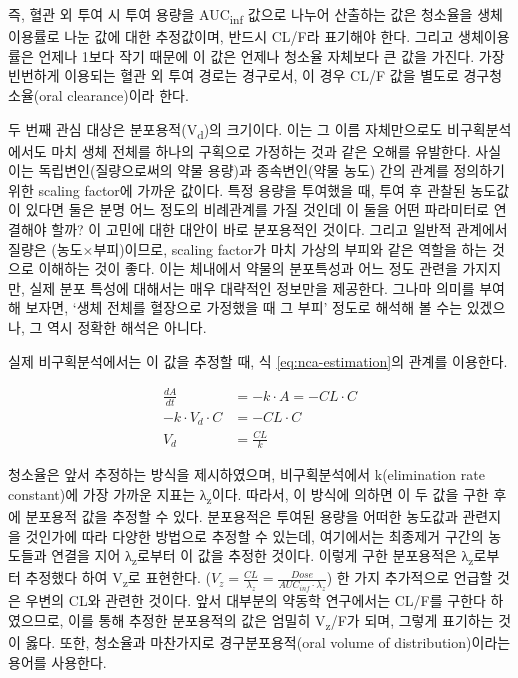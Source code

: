 \documentclass[
  11pt,
  krantz2, a4paper, twoside]{krantz}
\theoremstyle{definition}
\theoremstyle{definition}
\theoremstyle{definition}
\theoremstyle{definition}
\theoremstyle{remark}
\begin{document}
즉, 혈관 외 투여 시 투여 용량을 AUC\textsubscript{inf} 값으로 나누어 산출하는 값은 청소율을 생체이용률로 나눈 값에 대한 추정값이며, 반드시 CL/F라 표기해야 한다. 그리고 생체이용률은 언제나 1보다 작기 때문에 이 값은 언제나 청소율 자체보다 큰 값을 가진다. 가장 빈번하게 이용되는 혈관 외 투여 경로는 경구로서, 이 경우 CL/F 값을 별도로 경구청소율(oral clearance)이라 한다.

두 번째 관심 대상은 분포용적(V\textsubscript{d})의 크기이다.
이는 그 이름 자체만으로도 비구획분석에서도 마치 생체 전체를 하나의 구획으로 가정하는 것과 같은 오해를 유발한다.
사실 이는 독립변인(질량으로써의 약물 용량)과 종속변인(약물 농도) 간의 관계를 정의하기 위한 scaling factor에 가까운 값이다.
특정 용량을 투여했을 때, 투여 후 관찰된 농도값이 있다면 둘은 분명 어느 정도의 비례관계를 가질 것인데 이 둘을 어떤 파라미터로 연결해야 할까? 이 고민에 대한 대안이 바로 분포용적인 것이다. 그리고 일반적 관계에서 질량은 (농도×부피)이므로, scaling factor가 마치 가상의 부피와 같은 역할을 하는 것으로 이해하는 것이 좋다. 이는 체내에서 약물의 분포특성과 어느 정도 관련을 가지지만, 실제 분포 특성에 대해서는 매우 대략적인 정보만을 제공한다. 그나마 의미를 부여해 보자면, `생체 전체를 혈장으로 가정했을 때 그 부피' 정도로 해석해 볼 수는 있겠으나, 그 역시 정확한 해석은 아니다.

실제 비구획분석에서는 이 값을 추정할 때, 식 \eqref{eq:nca-estimation}의 관계를 이용한다.

\begin{equation}
\begin{split}
\frac{{dA}}{{dt}} &= - k \cdot A = - CL \cdot C \\
- k \cdot V_{d} \cdot C &= - CL \cdot C \\
V_{d} &= \frac{CL}{k}
\end{split}
\label{eq:nca-estimation}
\end{equation}

청소율은 앞서 추정하는 방식을 제시하였으며, 비구획분석에서 k(elimination rate constant)에 가장 가까운 지표는 λ\textsubscript{z}이다. 따라서, 이 방식에 의하면 이 두 값을 구한 후에 분포용적 값을 추정할 수 있다. 분포용적은 투여된 용량을 어떠한 농도값과 관련지을 것인가에 따라 다양한 방법으로 추정할 수 있는데, 여기에서는 최종제거 구간의 농도들과 연결을 지어 λ\textsubscript{z}로부터 이 값을 추정한 것이다. 이렇게 구한 분포용적은 λ\textsubscript{z}로부터 추정했다 하여 V\textsubscript{z}로 표현한다. (\(V_{z}=\frac{CL}{\lambda_{z}}=\frac{Dose}{AUC_{inf}\cdot \lambda_{z}}\)) 한 가지 추가적으로 언급할 것은 우변의 CL와 관련한 것이다. 앞서 대부분의 약동학 연구에서는 CL/F를 구한다 하였으므로, 이를 통해 추정한 분포용적의 값은 엄밀히 V\textsubscript{z}/F가 되며, 그렇게 표기하는 것이 옳다. 또한, 청소율과 마찬가지로 경구분포용적(oral volume of distribution)이라는 용어를 사용한다.
\end{document}
